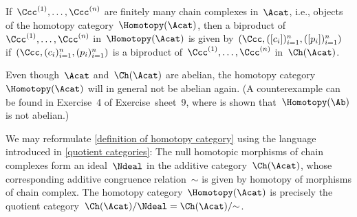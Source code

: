 \begin{remarkdefinition}
\begin{enumerate}
      If~$\Ccc^{(1)}, \dotsc, \Ccc^{(n)}$ are finitely many chain complexes in~$\Acat$, i.e., objects of the homotopy category~$\Homotopy(\Acat)$, then a biproduct of~$\Ccc^{(1)}, \dotsc, \Ccc^{(n)}$ in~$\Homotopy(\Acat)$ is given by~$(\Ccc, ([c_i])_{i=1}^n, ([p_i])_{i=1}^n)$ if~$(\Ccc, (c_i)_{i=1}^n, (p_i)_{i=1}^n)$ is a biproduct of~$\Ccc^{(1)}, \dotsc, \Ccc^{(n)}$ in~$\Ch(\Acat)$.
  \end{enumerate}
\end{remarkdefinition}


\begin{warningnonum}
  Even though~$\Acat$ and~$\Ch(\Acat)$ are abelian, the homotopy category~$\Homotopy(\Acat)$ will in general not be abelian again.
  (A counterexample can be found in Exercise~4 of Exercise~sheet~9, where is shown that~$\Homotopy(\Ab)$ is not abelian.)
\end{warningnonum}


\begin{remark*}
  We may reformulate \cref{definition of homotopy category} using the language introduced in \cref{quotient categories}:
  The null homotopic morphisms of chain complexes form an ideal~$\Ndeal$ in the additive category~$\Ch(\Acat)$, whose corresponding additive congruence relation~$\sim$ is given by homotopy of morphisms of chain complex.
  The homotopy category~$\Homotopy(\Acat)$ is precisely the quotient category~$\Ch(\Acat)/\Ndeal = \Ch(\Acat)/{\sim}$.
\end{remark*}




